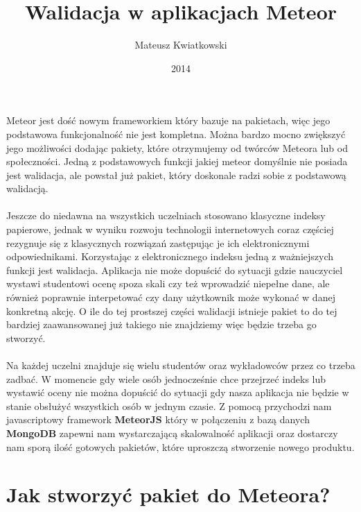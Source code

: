 \documentclass[brudnopis]{xmgr}
\author   {Mateusz Kwiatkowski}
\title    {Walidacja w aplikacjach Meteor}
\date     {2014}
\begin{document}
\begin{abstract}
\end{abstract}

\maketitle
%
\introduction

Meteor jest dość nowym frameworkiem który bazuje na pakietach, więc jego podstawowa funkcjonalność nie jest kompletna.
Można bardzo mocno zwiększyć jego możliwości dodając pakiety, które otrzymujemy od twórców Meteora lub od społeczności.
Jedną z podstawowych funkcji jakiej meteor domyślnie nie posiada jest walidacja, ale powstał już pakiet, który doskonale radzi
sobie z podstawową walidacją.
\\
\\
Jeszcze do niedawna na wszystkich uczelniach stosowano klasyczne indeksy
papierowe, jednak w wyniku rozwoju technologii internetowych coraz częściej
rezygnuje się z klasycznych rozwiązań zastępując je ich elektronicznymi odpowiednikami.
Korzystając z elektronicznego indeksu jedną z ważniejszych funkcji jest walidacja. Aplikacja nie może dopuścić do
sytuacji gdzie nauczyciel wystawi studentowi ocenę spoza skali czy też wprowadzić niepełne dane, ale również
poprawnie interpetować czy dany użytkownik może wykonać w danej konkretną akcję. O ile do tej prostszej części
walidacji istnieje pakiet to do tej bardziej zaawansowanej już takiego nie znajdziemy więc będzie trzeba go stworzyć.
\\
\\
Na każdej uczelni znajduje się wielu studentów oraz wykładowców przez co trzeba zadbać. W momencie
gdy wiele osób jednocześnie chce przejrzeć indeks lub wystawić oceny nie można dopuścić do sytuacji gdy nasza
aplikacja nie będzie w stanie obsłużyć wszystkich osób w jednym czasie. Z pomocą przychodzi nam javascriptowy
framework \textbf{MeteorJS} który w połączeniu z bazą danych \textbf{MongoDB} zapewni nam wystarczającą skalowalność
aplikacji oraz dostarczy nam sporą ilość gotowych pakietów, które uproszczą stworzenie nowego produktu.




\chapter{Jak stworzyć pakiet do Meteora?}


\end{document}
